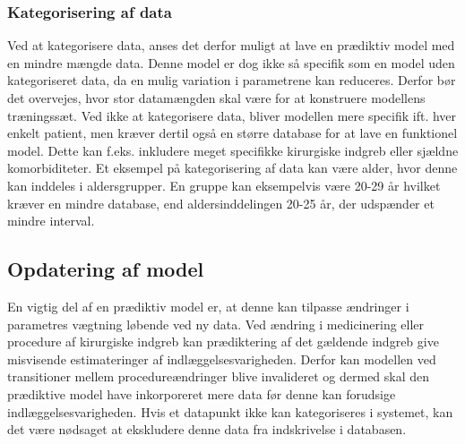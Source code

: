 \subsubsection{Kategorisering af data}
Ved at kategorisere data, anses det derfor muligt at lave en prædiktiv model med en mindre mængde data. Denne model er dog ikke så specifik som en model uden kategoriseret data, da en mulig variation i parametrene kan reduceres.\cite{Rowan2007} 
Derfor bør det overvejes, hvor stor datamængden skal være for at konstruere modellens træningssæt. Ved ikke at kategorisere data, bliver modellen mere specifik ift. hver enkelt patient, men kræver dertil også en større database for at lave en funktionel model. Dette kan f.eks. inkludere meget specifikke kirurgiske indgreb eller sjældne komorbiditeter. 
Et eksempel på kategorisering af data kan være alder, hvor denne kan inddeles i aldersgrupper. En gruppe kan eksempelvis være 20-29 år hvilket kræver en mindre database, end aldersinddelingen 20-25 år, der udspænder et mindre interval.\cite{Rowan2007}  

\subsection{Opdatering af model}
En vigtig del af en prædiktiv model er, at denne kan tilpasse ændringer i parametres vægtning løbende ved ny data.\cite{Kuhn2013} Ved ændring i medicinering eller procedure af kirurgiske indgreb kan prædiktering af det gældende indgreb give misvisende estimateringer af indlæggelsesvarigheden. Derfor kan modellen ved transitioner mellem procedureændringer blive invalideret og dermed skal den prædiktive model have inkorporeret mere data før denne kan forudsige indlæggelsesvarigheden. 
Hvis et datapunkt ikke kan kategoriseres i systemet, kan det være nødsaget at ekskludere denne data fra indskrivelse i databasen.

